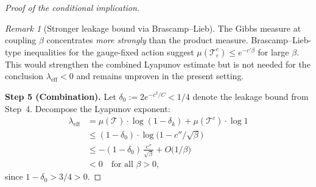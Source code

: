 \documentclass[12pt,a4paper]{article}
\theoremstyle{definition}
\theoremstyle{plain}
\theoremstyle{remark}
\newtheorem{remark}[definition]{Remark}
\begin{document}
\begin{proof}[Proof of the conditional implication]
\begin{remark}[Stronger leakage bound via Brascamp--Lieb]
The Gibbs measure at coupling $\beta$ concentrates \emph{more strongly}
than the product measure. Brascamp--Lieb-type inequalities for the
gauge-fixed action suggest $\mu(\mathcal{T}_\varepsilon^c) \leq e^{-c'\beta}$
for large $\beta$. This would strengthen the combined Lyapunov estimate
but is not needed for the conclusion $\lambda_{\mathrm{eff}} < 0$ and
remains unproven in the present setting.
\end{remark}

\medskip
\textbf{Step 5 (Combination).}
Let $\delta_0 := 2e^{-c^2/C} < 1/4$ denote the leakage bound from Step~4.
Decompose the Lyapunov exponent:
\begin{align*}
  \lambda_{\mathrm{eff}}
  &= \mu(\mathcal{T}) \cdot \log(1 - \delta_k) + \mu(\mathcal{T}^c) \cdot \log 1 \\
  &\leq (1 - \delta_0) \cdot \log\!\bigl(1 - c''/\sqrt{\beta}\bigr) \\
  &\leq -(1 - \delta_0)\,\frac{c''}{\sqrt{\beta}}
    + O\!\bigl(1/\beta\bigr) \\
  &< 0 \quad\text{for all } \beta > 0,
\end{align*}
since $1 - \delta_0 > 3/4 > 0$. \qedhere
\end{proof}
\end{document}
